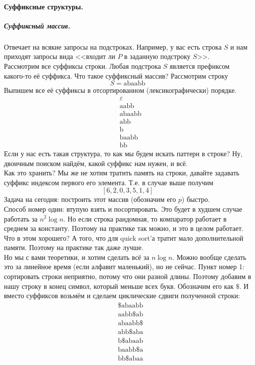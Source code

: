 \documentclass{article}
\begin{document}
    \paragraph{Суффиксные структуры.}
    \subparagraph{Суффиксный массив.}
    Отвечает на всякие запросы на подстроках. Например, у вас есть строка $S$ и нам приходят запросы вида <<входит ли $P$ в заданную подстроку $S$>>.\\
    Рассмотрим все суффиксы строки. Любая подстрока $S$ является префиксом какого-то её суффикса. Что такое суффиксный массив? Рассмотрим строку
    $$
    S=\mathrm{abaabb}
    $$
    Выпишем все её суффиксы в отсортированном (лексикографически) порядке.
    \begin{align*}
        &\varepsilon\\
        &\mathrm{aabb}\\
        &\mathrm{abaabb}\\
        &\mathrm{abb}\\
        &\mathrm{b}\\
        &\mathrm{baabb}\\
        &\mathrm{bb}
    \end{align*}
    Если у нас есть такая структура, то как мы будем искать паттерн в строке? Ну, двоичным поиском найдём, какой суффикс нам нужен, и всё.\\
    Как это хранить? Мы же не хотим тратить память на строки, давайте задавать суффикс индексом первого его элемента. Т.е. в случае выше получим
    $$
    [6,2,0,3,5,1,4]
    $$
    Задача на сегодня: построить этот массив (обозначим его $p$) быстро.\\
    Способ номер один: втупую взять и посортировать. Это будет в худшем случае работать за $n^2\log n$. Но если строка рандомная, то компаратор работает в среднем за константу. Поэтому на практике так можно, и это в целом работает. Что в этом хорошего? А того, что для quick sort'а тратит мало дополнительной памяти. Поэтому на практике так даже лучше.\\
    Но мы с вами теоретики, и хотим сделать всё за $n\log n$. Можно вообще сделать это за линейное время (если алфавит маленький), но не сейчас. Пункт номер 1: сортировать строки неприятно, потому что они разной длины. Поэтому добавим в нашу строку в конец символ, который меньше всех букв. Обозначим его как $\$$. И вместо суффиксов возьмём и сделаем циклические сдвиги полученной строки:
    \begin{align*}
        &\$\mathrm{abaabb}\\
        &\mathrm{aabb}\$\mathrm{ab}\\
        &\mathrm{abaabb}\$\\
        &\mathrm{abb}\$\mathrm{aba}\\
        &\mathrm{b}\$\mathrm{abaab}\\
        &\mathrm{baabb}\$\mathrm{a}\\
        &\mathrm{bb}\$\mathrm{abaa}
    \end{align*}
\end{document}

